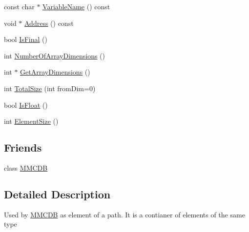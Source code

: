 \begin{DoxyCompactItemize}
\item 
const char $\ast$ \hyperlink{classMMCDBItem_a205f85f04d59e7db319727b450188ac4}{VariableName} () const 
\item 
void $\ast$ \hyperlink{classMMCDBItem_a231848e8fa7b83b8dd42c56acdc5517b}{Address} () const 
\item 
bool \hyperlink{classMMCDBItem_abb0bf898f79c3b621c17831fe0a3546d}{IsFinal} ()
\item 
int \hyperlink{classMMCDBItem_a42360b33f820463deba48a5f1cb350cf}{NumberOfArrayDimensions} ()
\item 
int $\ast$ \hyperlink{classMMCDBItem_af524a914ed2d2bf5834c39c415c912f9}{GetArrayDimensions} ()
\item 
int \hyperlink{classMMCDBItem_a143a8229802e60e3a994e1b50b5ee2c9}{TotalSize} (int fromDim=0)
\item 
bool \hyperlink{classMMCDBItem_ad5109b07c9777048677ea966ea33ef6a}{IsFloat} ()
\item 
int \hyperlink{classMMCDBItem_a4d498ad1b2cf3d00a848275da1c10d8f}{ElementSize} ()
\end{DoxyCompactItemize}
\subsection*{Friends}
\begin{DoxyCompactItemize}
\item 
\hypertarget{classMMCDBItem_a5d19313b8a1f99ced936931ecef35a69}{
class \hyperlink{classMMCDBItem_a5d19313b8a1f99ced936931ecef35a69}{MMCDB}}
\label{classMMCDBItem_a5d19313b8a1f99ced936931ecef35a69}

\end{DoxyCompactItemize}


\subsection{Detailed Description}
Used by \hyperlink{classMMCDB}{MMCDB} as element of a path. It is a contianer of elements of the same type 

